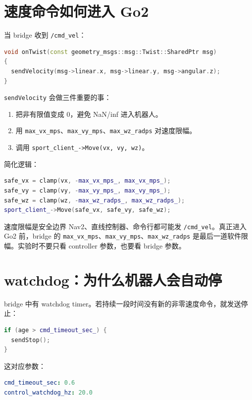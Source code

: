 \documentclass[UTF8,11pt,a4paper,openany]{ctexrep}
\newcommand{\code}[1]{\nolinkurl{#1}}
\newcommand{\topic}[1]{\nolinkurl{#1}}
\newcommand{\param}[1]{\nolinkurl{#1}}
\begin{document}
\section{速度命令如何进入 Go2}

当 bridge 收到 \topic{/cmd_vel}：

\begin{lstlisting}[language=cpp]
void onTwist(const geometry_msgs::msg::Twist::SharedPtr msg)
{
  sendVelocity(msg->linear.x, msg->linear.y, msg->angular.z);
}
\end{lstlisting}

\code{sendVelocity} 会做三件重要的事：

\begin{enumerate}
  \item 把非有限值变成 0，避免 NaN/inf 进入机器人。
  \item 用 \param{max_vx_mps}、\param{max_vy_mps}、\param{max_wz_radps} 对速度限幅。
  \item 调用 \code{sport_client_->Move(vx, vy, wz)}。
\end{enumerate}

简化逻辑：

\begin{lstlisting}[language=cpp]
safe_vx = clamp(vx, -max_vx_mps_, max_vx_mps_);
safe_vy = clamp(vy, -max_vy_mps_, max_vy_mps_);
safe_wz = clamp(wz, -max_wz_radps_, max_wz_radps_);
sport_client_->Move(safe_vx, safe_vy, safe_wz);
\end{lstlisting}

\begin{warnbox}{速度限幅是安全边界}
Nav2、直线控制器、命令行都可能发 \topic{/cmd_vel}。真正进入 Go2 前，bridge 的 \param{max_vx_mps}、\param{max_vy_mps}、\param{max_wz_radps} 是最后一道软件限幅。实验时不要只看 controller 参数，也要看 bridge 参数。
\end{warnbox}

\section{watchdog：为什么机器人会自动停}

bridge 中有 watchdog timer。若持续一段时间没有新的非零速度命令，就发送停止：

\begin{lstlisting}[language=cpp]
if (age > cmd_timeout_sec_) {
  sendStop();
}
\end{lstlisting}

这对应参数：

\begin{lstlisting}[language=yaml]
cmd_timeout_sec: 0.6
control_watchdog_hz: 20.0
\end{lstlisting}
\end{document}
